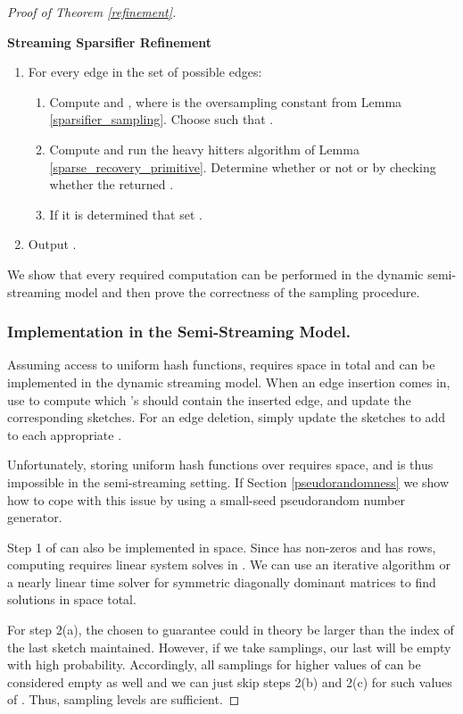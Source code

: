 \documentclass[11pt]{article}
\begin{document}
\begin{proof}[Proof of Theorem \ref{refinement}]
\begin{framed}{\noindent\bfseries Streaming Sparsifier Refinement}
\begin{enumerate}
\item For every edge  in the set of  possible edges:
\begin{enumerate}
\item Compute  and , where  is the oversampling constant from Lemma \ref{sparsifier_sampling}. Choose  such that .

\item Compute  and run the heavy hitters algorithm of Lemma \ref{sparse_recovery_primitive}. Determine whether or not  or  by checking whether the returned . 


\item If it is determined that  set .

\end{enumerate}

\item Output .
\end{enumerate}
\end{framed}

We show that every required computation can be performed in the dynamic semi-streaming model and then prove the correctness of the sampling procedure. 
\subsubsection*{Implementation in the Semi-Streaming Model.}
Assuming access to uniform hash functions,  requires  space in total and can be implemented in the dynamic streaming model. When an edge insertion comes in, use  to compute which 's should contain the inserted edge, and update the corresponding sketches. For an edge deletion, simply update the sketches to add  to each appropriate .

Unfortunately, storing  uniform hash functions over  requires  space, and is thus impossible in the semi-streaming setting. If Section \ref{pseudorandomness} we show how to cope with this issue by using a small-seed pseudorandom number generator.


Step 1 of  can also be implemented in  space. Since  has  non-zeros and  has  rows, computing  requires  linear system solves in . We can use an iterative algorithm or a nearly linear time solver for symmetric diagonally dominant matrices to find solutions in  space total.

For step 2(a), the  chosen to guarantee  could in theory be larger than the index of the last sketch  maintained. However, if we take  samplings, our last will be empty with high probability. Accordingly, all samplings for higher values of  can be considered empty as well and we can just skip steps 2(b) and 2(c) for such values of . Thus,  sampling levels are sufficient.



\end{proof}
\end{document}

